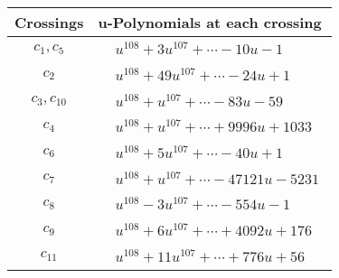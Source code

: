 \documentclass[1p]{elsarticle_modified}
\theoremstyle{definition}
\begin{document}
\begin{tabular}{m{50pt}|m{274pt}}
Crossings & \hspace{64pt}u-Polynomials at each crossing \\
\hline $$\begin{aligned}c_{1},c_{5}\end{aligned}$$&$\begin{aligned}
&u^{108}+3 u^{107}+\cdots-10 u-1
\end{aligned}$\\
\hline $$\begin{aligned}c_{2}\end{aligned}$$&$\begin{aligned}
&u^{108}+49 u^{107}+\cdots-24 u+1
\end{aligned}$\\
\hline $$\begin{aligned}c_{3},c_{10}\end{aligned}$$&$\begin{aligned}
&u^{108}+u^{107}+\cdots-83 u-59
\end{aligned}$\\
\hline $$\begin{aligned}c_{4}\end{aligned}$$&$\begin{aligned}
&u^{108}+u^{107}+\cdots+9996 u+1033
\end{aligned}$\\
\hline $$\begin{aligned}c_{6}\end{aligned}$$&$\begin{aligned}
&u^{108}+5 u^{107}+\cdots-40 u+1
\end{aligned}$\\
\hline $$\begin{aligned}c_{7}\end{aligned}$$&$\begin{aligned}
&u^{108}+u^{107}+\cdots-47121 u-5231
\end{aligned}$\\
\hline $$\begin{aligned}c_{8}\end{aligned}$$&$\begin{aligned}
&u^{108}-3 u^{107}+\cdots-554 u-1
\end{aligned}$\\
\hline $$\begin{aligned}c_{9}\end{aligned}$$&$\begin{aligned}
&u^{108}+6 u^{107}+\cdots+4092 u+176
\end{aligned}$\\
\hline $$\begin{aligned}c_{11}\end{aligned}$$&$\begin{aligned}
&u^{108}+11 u^{107}+\cdots+776 u+56
\end{aligned}$\\
\hline
\end{tabular}\\~\\
\end{document}
